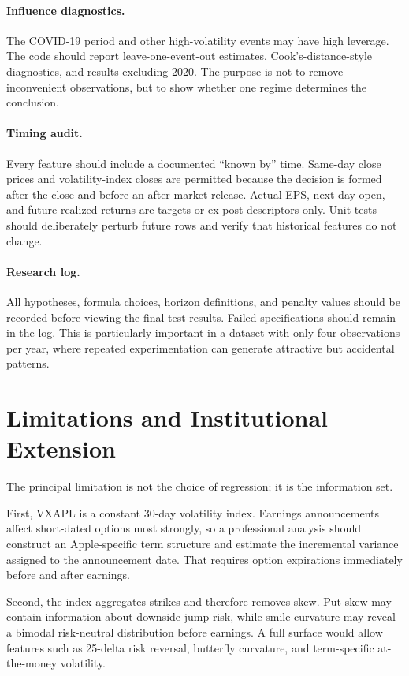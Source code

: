 \documentclass[11pt]{article}
\begin{document}
\paragraph{Influence diagnostics.}
The COVID-19 period and other high-volatility events may have high leverage. The code should report leave-one-event-out estimates, Cook's-distance-style diagnostics, and results excluding 2020. The purpose is not to remove inconvenient observations, but to show whether one regime determines the conclusion.

\paragraph{Timing audit.}
Every feature should include a documented ``known by'' time. Same-day close prices and volatility-index closes are permitted because the decision is formed after the close and before an after-market release. Actual EPS, next-day open, and future realized returns are targets or ex post descriptors only. Unit tests should deliberately perturb future rows and verify that historical features do not change.

\paragraph{Research log.}
All hypotheses, formula choices, horizon definitions, and penalty values should be recorded before viewing the final test results. Failed specifications should remain in the log. This is particularly important in a dataset with only four observations per year, where repeated experimentation can generate attractive but accidental patterns.

\section{Limitations and Institutional Extension}

The principal limitation is not the choice of regression; it is the information set.

First, VXAPL is a constant 30-day volatility index. Earnings announcements affect short-dated options most strongly, so a professional analysis should construct an Apple-specific term structure and estimate the incremental variance assigned to the announcement date. That requires option expirations immediately before and after earnings.

Second, the index aggregates strikes and therefore removes skew. Put skew may contain information about downside jump risk, while smile curvature may reveal a bimodal risk-neutral distribution before earnings. A full surface would allow features such as 25-delta risk reversal, butterfly curvature, and term-specific at-the-money volatility.
\end{document}
